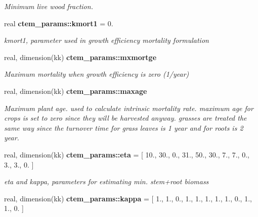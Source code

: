 \begin{DoxyCompactItemize}
\begin{DoxyCompactList}\small\item\em Minimum live wood fraction. \end{DoxyCompactList}\item 
\hypertarget{namespacectem__params_a7847d74c6ea4e5d157002a72f86036c1}{}real {\bfseries ctem\+\_\+params\+::kmort1} = 0.\label{namespacectem__params_a7847d74c6ea4e5d157002a72f86036c1}

\begin{DoxyCompactList}\small\item\em kmort1, parameter used in growth efficiency mortality formulation \end{DoxyCompactList}\item 
\hypertarget{namespacectem__params_aeb439e2ba908efa216016855a3f2b166}{}real, dimension(kk) {\bfseries ctem\+\_\+params\+::mxmortge}\label{namespacectem__params_aeb439e2ba908efa216016855a3f2b166}

\begin{DoxyCompactList}\small\item\em Maximum mortality when growth efficiency is zero (1/year) \end{DoxyCompactList}\item 
\hypertarget{namespacectem__params_a90ed5402c77306a5b310717f1201a5d9}{}real, dimension(kk) {\bfseries ctem\+\_\+params\+::maxage}\label{namespacectem__params_a90ed5402c77306a5b310717f1201a5d9}

\begin{DoxyCompactList}\small\item\em Maximum plant age. used to calculate intrinsic mortality rate. maximum age for crops is set to zero since they will be harvested anyway. grasses are treated the same way since the turnover time for grass leaves is 1 year and for roots is 2 year. \end{DoxyCompactList}\item 
\hypertarget{namespacectem__params_af316f76bee6244c68e937ed9e399bbd0}{}real, dimension(kk) {\bfseries ctem\+\_\+params\+::eta} = \mbox{[} 10., 30., 0., 31., 50., 30., 7., 7., 0., 3., 3., 0. \mbox{]}\label{namespacectem__params_af316f76bee6244c68e937ed9e399bbd0}

\begin{DoxyCompactList}\small\item\em eta and kappa, parameters for estimating min. stem+root biomass \end{DoxyCompactList}\item 
\hypertarget{namespacectem__params_a31cd33c14ab64d6e347e8fa8649c0ac8}{}real, dimension(kk) {\bfseries ctem\+\_\+params\+::kappa} = \mbox{[} 1., 1., 0., 1., 1., 1., 1., 1., 0., 1., 1., 0. \mbox{]}\label{namespacectem__params_a31cd33c14ab64d6e347e8fa8649c0ac8}


\end{DoxyCompactItemize}
